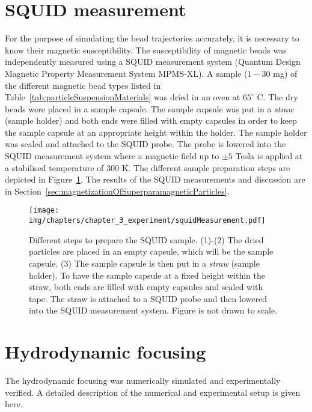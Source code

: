 \section{SQUID measurement}\label{sec:squidMeasurement}
For the purpose of simulating the bead trajectories accurately, it is necessary to know their magnetic susceptibility. The susceptibility of magnetic beads was independently measured using a SQUID measurement system (Quantum Design Magnetic Property Measurement System MPMS-XL). A sample ($1-30$ mg) of the different magnetic bead types listed in Table~\ref{tab:particleSuspensionMaterials} was dried in an oven at $65^\circ$ C. The dry beads were placed in a sample capsule. The sample capsule was put in a \textit{straw} (sample holder) and both ends were filled with empty capsules in order to keep the sample capsule at an appropriate height within the holder. The sample holder was  sealed and attached to the SQUID probe. The probe is lowered into the SQUID measurement system where a magnetic field up to $\pm5$ Tesla is applied at a stabilised temperature of $300$ K. The different sample preparation steps are depicted in Figure~\ref{fig:squidSamplePerparation}. The results of the SQUID measurements and discussion are in Section~\ref{sec:magnetizationOfSuperparamagneticParticles}.

\begin{figure}[htb]
	\centering
   \texttt{[image: img/chapters/chapter\_3\_experiment/squidMeasurement.pdf]}
	\caption[SQUID experiment sample holder preparation]{Different steps to prepare the SQUID sample. (1)-(2) The dried particles are placed in an empty capsule, which will be the sample capsule. (3) The sample capsule is then put in a \textit{straw} (sample holder). To have the sample capsule at a fixed height within the straw, both ends are filled with empty capsules and sealed with tape. The straw is attached to a SQUID probe and then lowered into the SQUID measurement system. Figure is not drawn to scale.}
\label{fig:squidSamplePerparation}
\end{figure}

\section{Hydrodynamic focusing}\label{sec:hydrodynamicFocusing}
The hydrodynamic focusing was numerically simulated and experimentally verified. A detailed description of the numerical and experimental setup is given here.  
 
